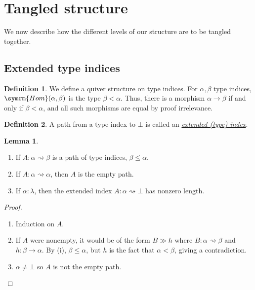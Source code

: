 \documentclass{article}
\newcommand{\cdef}[3]{\href{https://leanprover-community.github.io/con-nf/doc/ConNF/#1.html\#ConNF.#2}{\emph{#3}}}
\theoremstyle{definition}
\newtheorem{definition}{Definition}[section]
\newtheorem{lemma}[theorem]{Lemma}
\theoremstyle{remark}
\begin{document}
\section{Tangled structure}

We now describe how the different levels of our structure are to be tangled together.

\subsection{Extended type indices}

\begin{definition}
    We define a quiver structure on type indices.
    For \( \alpha, \beta \) type indices, \( \symrm{Hom}(\alpha, \beta) \) is the type \( \beta < \alpha \).
    Thus, there is a morphism \( \alpha \to \beta \) if and only if \( \beta < \alpha \), and all such morphisms are equal by proof irrelevance.
\end{definition}
\begin{definition}
    A path from a type index to \( \bot \) is called an \cdef{Structural/Index}{ExtendedIndex}{extended (type) index}.
\end{definition}
\begin{lemma}
    \label{lem:path_props}
    \begin{enumerate}
        \item If \( A : \alpha \rightsquigarrow \beta \) is a path of type indices, \( \beta \leq \alpha \).
        \item If \( A : \alpha \rightsquigarrow \alpha \), then \( A \) is the empty path.
        \item If \( \alpha : \lambda \), then the extended index \( A : \alpha \rightsquigarrow \bot \) has nonzero length.
    \end{enumerate}
\end{lemma}
\begin{proof}
    \begin{enumerate}
        \item Induction on \( A \).
        \item If \( A \) were nonempty, it would be of the form \( B \gg h \) where \( B : \alpha \rightsquigarrow \beta \) and \( h : \beta \to \alpha \).
        By (i), \( \beta \leq \alpha \), but \( h \) is the fact that \( \alpha < \beta \), giving a contradiction.
        \item \( \alpha \neq \bot \) so \( A \) is not the empty path.
    \end{enumerate}
\end{proof}
\end{document}
